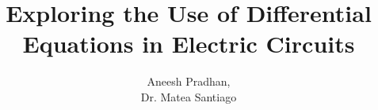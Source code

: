\title {Exploring the Use of Differential Equations in Electric Circuits}
\author {Aneesh Pradhan,
    \vspace{0.5in}\\
    Dr. Matea Santiago\\
    \vspace{1in}}
